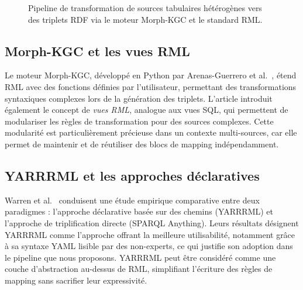 \begin{figure}[H]
    
    \vspace{0.5cm}
    \caption{Pipeline de transformation de sources tabulaires hétérogènes vers des triplets RDF via le moteur Morph-KGC et le standard RML.}
    \label{fig:pipeline_rml}
\end{figure}

\subsection{Morph-KGC et les vues RML}
Le moteur Morph-KGC, développé en Python par Arenas-Guerrero et al.~\cite{arenas2023morphkgc}, étend RML avec des fonctions définies par l'utilisateur, permettant des transformations syntaxiques complexes lors de la génération des triplets. L'article introduit également le concept de \textit{vues RML}, analogue aux vues SQL, qui permettent de modulariser les règles de transformation pour des sources complexes. Cette modularité est particulièrement précieuse dans un contexte multi-sources, car elle permet de maintenir et de réutiliser des blocs de mapping indépendamment.

\subsection{YARRRML et les approches déclaratives}
Warren et al.~\cite{warren2024yarrrml} conduisent une étude empirique comparative entre deux paradigmes : l'approche déclarative basée sur des chemins (YARRRML) et l'approche de triplification directe (SPARQL Anything). Leurs résultats désignent YARRRML comme l'approche offrant la meilleure utilisabilité, notamment grâce à sa syntaxe YAML lisible par des non-experts, ce qui justifie son adoption dans le pipeline que nous proposons. YARRRML peut être considéré comme une couche d'abstraction au-dessus de RML, simplifiant l'écriture des règles de mapping sans sacrifier leur expressivité.

